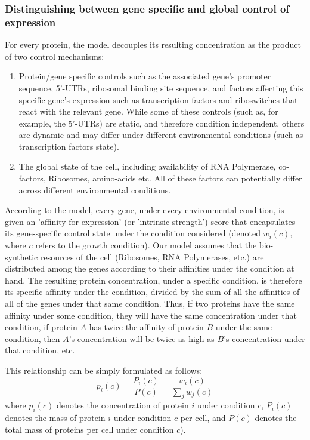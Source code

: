 \documentclass[notitlepage]{article}
\begin{document}
\subsubsection{Distinguishing between gene specific and global control of expression}
For every protein, the model decouples its resulting concentration as the product of two control mechanisms:
\begin{enumerate}
\item Protein/gene specific controls such as the associated gene's promoter sequence, 5'-UTRs, ribosomal binding site sequence, and factors affecting this specific gene's expression such as transcription factors and riboswitches that react with the relevant gene.
  While some of these controls (such as, for example, the 5'-UTRs) are static, and therefore condition independent, others are dynamic and may differ under different environmental conditions (such as transcription factors state).
\item The global state of the cell, including availability of RNA Polymerase, co-factors, Ribosomes, amino-acids etc.
  All of these factors can potentially differ across different environmental conditions.
\end{enumerate}
According to the model, every gene, under every environmental condition, is given an 'affinity-for-expression' (or 'intrinsic-strength') score that encapsulates its gene-specific control state under the condition considered (denoted $w_i(c)$, where $c$ refers to the growth condition).
Our model assumes that the bio-synthetic resources of the cell (Ribosomes, RNA Polymerases, etc.) are distributed among the genes according to their affinities under the condition at hand.
The resulting protein concentration, under a specific condition, is therefore its specific affinity under the condition, divided by the sum of all the affinities of all of the genes under that same condition.
Thus, if two proteins have the same affinity under some condition, they will have the same concentration under that condition, if protein $A$ has twice the affinity of protein $B$ under the same condition, then $A$'s concentration will be twice as high as $B$'s concentration under that condition, etc.

This relationship can be simply formulated as follows:
\begin{equation}
  \label{eq:concentration-ratio}
  p_i(c)=\frac{P_i(c)}{P(c)}=\frac{w_i(c)}{\sum_jw_j(c)}
\end{equation}
where $p_i(c)$ denotes the concentration of protein $i$ under condition $c$, $P_i(c)$ denotes the mass of protein $i$ under condition $c$ per cell, and $P(c)$ denotes the total mass of proteins per cell under condition $c$).
\end{document}
